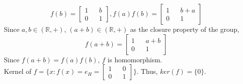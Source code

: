 \documentclass{article}
\newcommand{\R}{\mathbb{R}}
\begin{document}
\begin{enumerate}
\[	  		f(b) = \begin{bmatrix}
	  			1 && b\\
	  			0 && 1
	  		\end{bmatrix},
	  		f(a)f(b) = \begin{bmatrix}
	  			1 && b+a\\
	  			0 && 1
	  		\end{bmatrix}
	  		\]
	  		Since $a,b \in (\R, +)$, $(a+b) \in (\R, +)$ as the closure property of the group,
	  		\[
	  		f(a+b) = \begin{bmatrix}
		  		1 && a + b\\
		  		0 && 1
	  		\end{bmatrix}
	  		\]
	  		Since $f(a+b) = f(a)f(b)$, $f$ is homomorphism.\\
	  		Kernel of $f = \{x: f(x) = e_H = \begin{bmatrix}
		  		1 && 0\\
		  		0 && 1
	  		\end{bmatrix}\}$. Thus, $ker(f) = \{0\}$.
		\end{enumerate}
	
\end{document}
